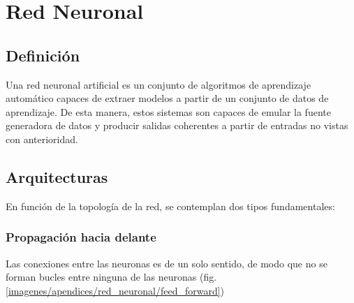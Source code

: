 \section{Red Neuronal}
\subsection{Definición}
Una red neuronal artificial es un conjunto de algoritmos de aprendizaje automático capaces de extraer modelos a partir de un conjunto de datos de aprendizaje. De esta manera, estos sistemas son capaces de emular la fuente generadora de datos y producir salidas coherentes a partir de entradas no vistas con anterioridad.
\subsection{Arquitecturas}
En función de la topología de la red, se contemplan dos tipos fundamentales:
\subsubsection{Propagación hacia delante}
Las conexiones entre las neuronas es de un solo sentido, de modo que no se forman bucles entre ninguna de las neuronas (fig. \ref{imagenes/apendices/red_neuronal/feed_forward})